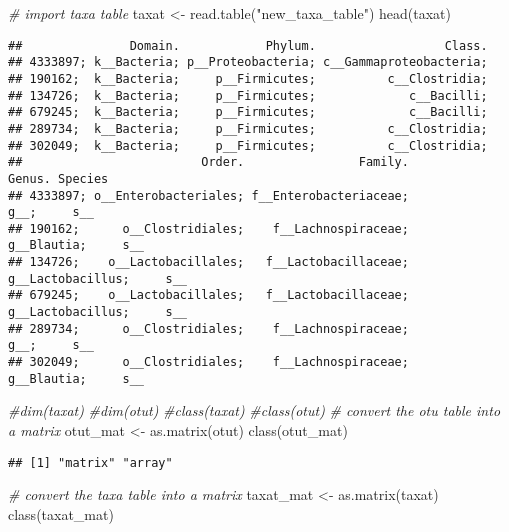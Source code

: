 \documentclass[
]{article}
\newenvironment{Shaded}{\begin{snugshade}}{\end{snugshade}}
\newcommand{\CommentTok}[1]{\textcolor[rgb]{0.56,0.35,0.01}{\textit{#1}}}
\newcommand{\FunctionTok}[1]{\textcolor[rgb]{0.00,0.00,0.00}{#1}}
\newcommand{\NormalTok}[1]{#1}
\newcommand{\OtherTok}[1]{\textcolor[rgb]{0.56,0.35,0.01}{#1}}
\newcommand{\StringTok}[1]{\textcolor[rgb]{0.31,0.60,0.02}{#1}}
\begin{document}
\begin{Shaded}
\begin{Highlighting}[]
\CommentTok{\# import taxa table}
\NormalTok{taxat }\OtherTok{\textless{}{-}} \FunctionTok{read.table}\NormalTok{(}\StringTok{"new\_taxa\_table"}\NormalTok{) }
\FunctionTok{head}\NormalTok{(taxat)}
\end{Highlighting}
\end{Shaded}

\begin{verbatim}
##               Domain.            Phylum.                  Class.
## 4333897; k__Bacteria; p__Proteobacteria; c__Gammaproteobacteria;
## 190162;  k__Bacteria;     p__Firmicutes;          c__Clostridia;
## 134726;  k__Bacteria;     p__Firmicutes;             c__Bacilli;
## 679245;  k__Bacteria;     p__Firmicutes;             c__Bacilli;
## 289734;  k__Bacteria;     p__Firmicutes;          c__Clostridia;
## 302049;  k__Bacteria;     p__Firmicutes;          c__Clostridia;
##                         Order.                Family.            Genus. Species
## 4333897; o__Enterobacteriales; f__Enterobacteriaceae;              g__;     s__
## 190162;      o__Clostridiales;    f__Lachnospiraceae;       g__Blautia;     s__
## 134726;    o__Lactobacillales;   f__Lactobacillaceae; g__Lactobacillus;     s__
## 679245;    o__Lactobacillales;   f__Lactobacillaceae; g__Lactobacillus;     s__
## 289734;      o__Clostridiales;    f__Lachnospiraceae;              g__;     s__
## 302049;      o__Clostridiales;    f__Lachnospiraceae;       g__Blautia;     s__
\end{verbatim}

\begin{Shaded}
\begin{Highlighting}[]
\CommentTok{\#dim(taxat)}
\CommentTok{\#dim(otut)}
\CommentTok{\#class(taxat)}
\CommentTok{\#class(otut)}
\CommentTok{\# convert the otu table into a matrix}
\NormalTok{otut\_mat }\OtherTok{\textless{}{-}} \FunctionTok{as.matrix}\NormalTok{(otut) }
\FunctionTok{class}\NormalTok{(otut\_mat)}
\end{Highlighting}
\end{Shaded}

\begin{verbatim}
## [1] "matrix" "array"
\end{verbatim}

\begin{Shaded}
\begin{Highlighting}[]
\CommentTok{\# convert the taxa table into a matrix}
\NormalTok{taxat\_mat }\OtherTok{\textless{}{-}} \FunctionTok{as.matrix}\NormalTok{(taxat) }
\FunctionTok{class}\NormalTok{(taxat\_mat)}
\end{Highlighting}
\end{Shaded}
\end{document}
